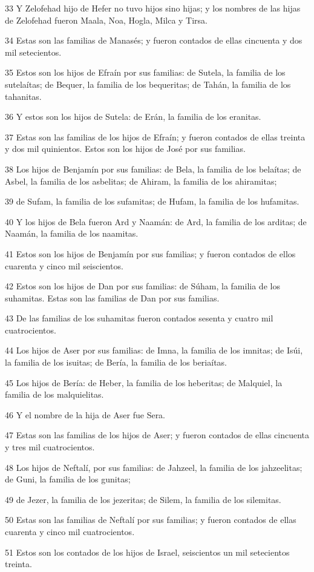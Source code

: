 \par 33 Y Zelofehad hijo de Hefer no tuvo hijos sino hijas; y los nombres de las hijas de Zelofehad fueron Maala, Noa, Hogla, Milca y Tirsa.
\par 34 Estas son las familias de Manasés; y fueron contados de ellas cincuenta y dos mil setecientos.
\par 35 Estos son los hijos de Efraín por sus familias: de Sutela, la familia de los sutelaítas; de Bequer, la familia de los bequeritas; de Tahán, la familia de los tahanitas.
\par 36 Y estos son los hijos de Sutela: de Erán, la familia de los eranitas.
\par 37 Estas son las familias de los hijos de Efraín; y fueron contados de ellas treinta y dos mil quinientos. Estos son los hijos de José por sus familias.
\par 38 Los hijos de Benjamín por sus familias: de Bela, la familia de los belaítas; de Asbel, la familia de los asbelitas; de Ahiram, la familia de los ahiramitas;
\par 39 de Sufam, la familia de los sufamitas; de Hufam, la familia de los hufamitas.
\par 40 Y los hijos de Bela fueron Ard y Naamán: de Ard, la familia de los arditas; de Naamán, la familia de los naamitas.
\par 41 Estos son los hijos de Benjamín por sus familias; y fueron contados de ellos cuarenta y cinco mil seiscientos.
\par 42 Estos son los hijos de Dan por sus familias: de Súham, la familia de los suhamitas. Estas son las familias de Dan por sus familias.
\par 43 De las familias de los suhamitas fueron contados sesenta y cuatro mil cuatrocientos.
\par 44 Los hijos de Aser por sus familias: de Imna, la familia de los imnitas; de Isúi, la familia de los isuitas; de Bería, la familia de los beriaítas.
\par 45 Los hijos de Bería: de Heber, la familia de los heberitas; de Malquiel, la familia de los malquielitas.
\par 46 Y el nombre de la hija de Aser fue Sera.
\par 47 Estas son las familias de los hijos de Aser; y fueron contados de ellas cincuenta y tres mil cuatrocientos.
\par 48 Los hijos de Neftalí, por sus familias: de Jahzeel, la familia de los jahzeelitas; de Guni, la familia de los gunitas;
\par 49 de Jezer, la familia de los jezeritas; de Silem, la familia de los silemitas.
\par 50 Estas son las familias de Neftalí por sus familias; y fueron contados de ellas cuarenta y cinco mil cuatrocientos.
\par 51 Estos son los contados de los hijos de Israel, seiscientos un mil setecientos treinta.

